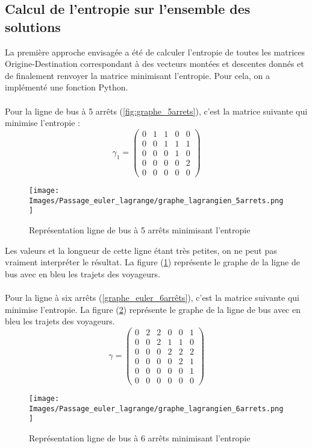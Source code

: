 \documentclass[12pt]{article}
\begin{document}
\subsection{Calcul de l'entropie sur l'ensemble des solutions}
La première approche envisagée a été de calculer l'entropie de toutes les matrices Origine-Destination correspondant à des vecteurs montées et descentes donnés et de finalement renvoyer la matrice minimisant l'entropie. Pour cela, on a implémenté une fonction Python.\\
\\
Pour la ligne de bus à 5 arrêts (\ref{fig:graphe_5arrets}), c'est la matrice suivante qui minimise l'entropie :
 \[\gamma_1 = 
\begin{pmatrix}
0 & 1 & 1 & 0 & 0\\
0 & 0 & 1 & 1 &  1\\
0 & 0 & 0 & 1 & 0 \\
0 & 0 & 0 & 0 & 2 \\
0 & 0 & 0 & 0 & 0 
\end{pmatrix}\]
\begin{figure}[H]
    \centering
    \texttt{[image: Images/Passage\_euler\_lagrange/graphe\_lagrangien\_5arrets.png]}
    \caption{Représentation ligne de bus à 5 arrêts minimisant l'entropie}
    \label{graphe_lagrange_5arrêts}
\end{figure}
Les valeurs et la longueur de cette ligne étant très petites, on ne peut pas vraiment interpréter le résultat. La figure (\ref{graphe_lagrange_5arrêts}) représente le graphe de la ligne de bus avec en bleu les trajets des voyageurs.\\
\\
Pour la ligne à six arrêts (\ref{graphe_euler_6arrêts}), c'est la matrice suivante qui minimise l'entropie.  La figure (\ref{graphe_lagrange_6arrêts}) représente le graphe de la ligne de bus avec en bleu les trajets des voyageurs.
 \[\gamma = 
\begin{pmatrix}
0 & 2 & 2 & 0 & 0 & 1\\
0 & 0 & 2 & 1 &  1 & 0\\
0 & 0 & 0 & 2 & 2 & 2 \\
0 & 0 & 0 & 0 & 2 & 1 \\
0 & 0 & 0 & 0 & 0 & 1 \\
0 & 0 & 0 & 0 & 0 & 0
\end{pmatrix}\]
\begin{figure}[H]
    \centering
    \texttt{[image: Images/Passage\_euler\_lagrange/graphe\_lagrangien\_6arrets.png]}
    \caption{Représentation ligne de bus à 6 arrêts minimisant l'entropie}
    \label{graphe_lagrange_6arrêts}
\end{figure}
\end{document}
